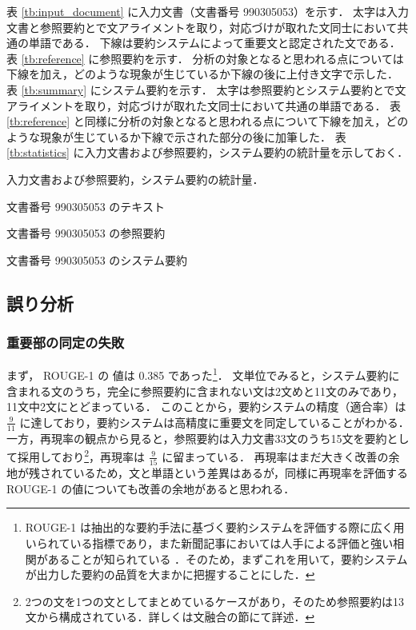 表 \ref{tb:input_document} に入力文書（文書番号 990305053）を示す．
太字は入力文書と参照要約とで文アライメントを取り，対応づけが取れた文同士において共通の単語である．
下線は要約システムによって重要文と認定された文である．
表 \ref{tb:reference} に参照要約を示す．
分析の対象となると思われる点については下線を加え，どのような現象が生じているか下線の後に上付き文字で示した．
表 \ref{tb:summary} にシステム要約を示す．
太字は参照要約とシステム要約とで文アライメントを取り，対応づけが取れた文同士において共通の単語である．
表 \ref{tb:reference} と同様に分析の対象となると思われる点について下線を加え，どのような現象が生じているか下線で示された部分の後に加筆した．
表 \ref{tb:statistics} に入力文書および参照要約，システム要約の統計量を示しておく．

\begin{table}[b]
\caption{入力文書および参照要約，システム要約の統計量．}
\label{tb:statistics}

\end{table}

\begin{table}[p]
\caption{文書番号 990305053 のテキスト}
\label{tb:input_document}

\end{table}

\begin{table}[p]
\caption{文書番号 990305053 の参照要約}
\label{tb:reference}

\end{table}
\begin{table}[p]
\caption{文書番号 990305053 のシステム要約}
\label{tb:summary}

\end{table}


\subsection{誤り分析}
\label{sc:誤り分析}

\subsubsection{重要部の同定の失敗}
\label{sc:重要部の同定の失敗}

まず， ROUGE-1 \cite{lin04} の 値は 0.385 であった\footnote{
ROUGE-1 は抽出的な要約手法に基づく要約システムを評価する際に広く用いられている指標であり，また新聞記事においては人手による評価と強い相関があることが知られている \cite{lin04} ．そのため，まずこれを用いて，要約システムが出力した要約の品質を大まかに把握することにした．}．
文単位でみると，システム要約に含まれる文のうち，完全に参照要約に含まれない文は2文めと11文のみであり，11文中2文にとどまっている．
このことから，要約システムの精度（適合率）は $ \frac{9}{11} $ に達しており，要約システムは高精度に重要文を同定していることがわかる．
一方，再現率の観点から見ると，参照要約は入力文書33文のうち15文を要約として採用しており\footnote{
2つの文を1つの文としてまとめているケースがあり，そのため参照要約は13文から構成されている．詳しくは文融合の節にて詳述．}，再現率は $ \frac{9}{15} $ に留まっている．
再現率はまだ大きく改善の余地が残されているため，文と単語という差異はあるが，同様に再現率を評価する ROUGE-1 の値についても改善の余地があると思われる．

